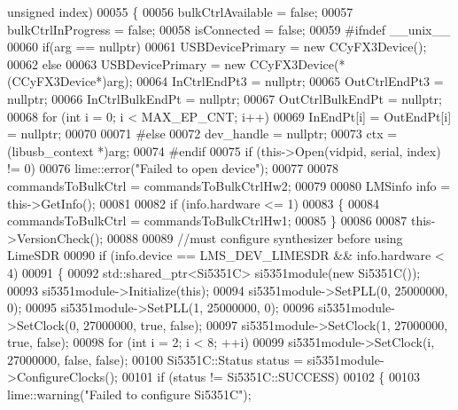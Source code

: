 \begin{DoxyCode}
{      unsigned} index)
00055 \{
00056     bulkCtrlAvailable = \textcolor{keyword}{false};
00057     bulkCtrlInProgress = \textcolor{keyword}{false};
00058     isConnected = \textcolor{keyword}{false};
00059 \textcolor{preprocessor}{#ifndef \_\_unix\_\_}
00060     \textcolor{keywordflow}{if}(arg == \textcolor{keyword}{nullptr})
00061         USBDevicePrimary = \textcolor{keyword}{new} CCyFX3Device();
00062     \textcolor{keywordflow}{else}
00063         USBDevicePrimary = \textcolor{keyword}{new} CCyFX3Device(*(CCyFX3Device*)arg);
00064     InCtrlEndPt3 = \textcolor{keyword}{nullptr};
00065     OutCtrlEndPt3 = \textcolor{keyword}{nullptr};
00066     InCtrlBulkEndPt = \textcolor{keyword}{nullptr};
00067     OutCtrlBulkEndPt = \textcolor{keyword}{nullptr};
00068     \textcolor{keywordflow}{for} (\textcolor{keywordtype}{int} i = 0; i < MAX\_EP\_CNT; i++)
00069         InEndPt[i] = OutEndPt[i] = \textcolor{keyword}{nullptr};
00070 
00071 \textcolor{preprocessor}{#else}
00072     dev\_handle = \textcolor{keyword}{nullptr};
00073     ctx = (libusb\_context *)arg;
00074 \textcolor{preprocessor}{#endif}
00075     \textcolor{keywordflow}{if} (this->Open(vidpid, serial, index) != 0)
00076         lime::error(\textcolor{stringliteral}{"Failed to open device"});
00077 
00078     commandsToBulkCtrl = commandsToBulkCtrlHw2;
00079 
00080     LMSinfo info = this->GetInfo();
00081 
00082     \textcolor{keywordflow}{if} (info.hardware <= 1)
00083     \{
00084         commandsToBulkCtrl = commandsToBulkCtrlHw1;
00085     \}
00086 
00087     this->VersionCheck();
00088 
00089     \textcolor{comment}{//must configure synthesizer before using LimeSDR}
00090     \textcolor{keywordflow}{if} (info.device == LMS_DEV_LIMESDR && info.hardware < 4)
00091     \{
00092         std::shared\_ptr<Si5351C> si5351module(\textcolor{keyword}{new} Si5351C());
00093         si5351module->Initialize(\textcolor{keyword}{this});
00094         si5351module->SetPLL(0, 25000000, 0);
00095         si5351module->SetPLL(1, 25000000, 0);
00096         si5351module->SetClock(0, 27000000, \textcolor{keyword}{true}, \textcolor{keyword}{false});
00097         si5351module->SetClock(1, 27000000, \textcolor{keyword}{true}, \textcolor{keyword}{false});
00098         \textcolor{keywordflow}{for} (\textcolor{keywordtype}{int} i = 2; i < 8; ++i)
00099             si5351module->SetClock(i, 27000000, \textcolor{keyword}{false}, \textcolor{keyword}{false});
00100         Si5351C::Status status = si5351module->ConfigureClocks();
00101         \textcolor{keywordflow}{if} (status != Si5351C::SUCCESS)
00102         \{
00103             lime::warning(\textcolor{stringliteral}{"Failed to configure Si5351C"});

\end{DoxyCode}
